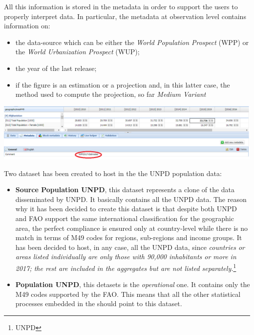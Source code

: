 \documentclass[nojss]{jss}\usepackage[]{graphicx}\usepackage[]{color}
\begin{document}
All this information is stored in the metadata in order to support the users to properly interpret data.
In particular, the metadata at observation level contains information on:

\begin{itemize}
\item{the data-source which can be either the \textit{World Population Prospect} (WPP) or the \textit{World Urbanization Prospect} (WUP); }
\item{the year of the last release;}
\item{if the figure is an estimation or a projection and, in this latter case, the method used to compute the projection, so far \textit{Medium Variant}}
\end{itemize}



\begin{center}
\includegraphics{metadata.PNG}
\end{center}


Two dataset has been created to host in the  the UNPD population data:
\begin{itemize}
\item{\textbf{Source Population UNPD}, this dataset represents a clone of the data disseminated by UNPD. It basically contains all the UNPD data. The reason why it has been decided to create this dataset is that despite both UNPD and FAO support the same international classification for the geographic area, the perfect compliance is ensured only at country-level while there is no match in terms of M49 codes for regions, sub-regions and income groups. It has been decided to host, in any case, all the UNPD data, since \textit{countries or areas listed individually are only those with 90,000 inhabitants or more in 2017; the rest are included in the aggregates but are not listed separately.}\footnote{UNPD}}
\item{\textbf{Population UNPD}, this detasets is the \textit{operational} one. It contains only the M49 codes supported by the FAO. This means that all the other statistical processes embedded in the  should point to this dataset.}
\end{itemize}
\end{document}
